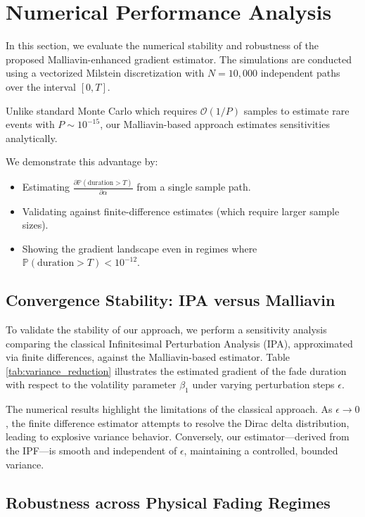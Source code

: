 \documentclass[11pt]{article}
\newcommand{\Pb}{\mathbb P}
\begin{document}
\section{Numerical Performance Analysis}\label{sec:Num_Perf}

In this section, we evaluate the numerical stability and robustness of the proposed Malliavin-enhanced gradient estimator. The simulations are conducted using a vectorized Milstein discretization with $N=10,000$ independent paths over the interval $[0, T]$.

Unlike standard Monte Carlo which requires $\mathcal{O}(1/P)$ samples to estimate rare events with $P \sim 10^{-15}$, our Malliavin-based approach estimates sensitivities analytically.

We demonstrate this advantage by:
\begin{itemize}
    \item[(a)] Estimating $\frac{\partial \Pb(\text{duration}>T)}{\partial \alpha}$ from a single sample path.
    \item[(b)] Validating against finite-difference estimates (which require larger sample sizes).
    \item[(c)] Showing the gradient landscape even in regimes where $\Pb(\text{duration}>T) < 10^{-12}$.
\end{itemize}

\subsection{Convergence Stability: IPA versus Malliavin}

To validate the stability of our approach, we perform a sensitivity analysis comparing the classical Infinitesimal Perturbation Analysis (IPA), approximated via finite differences, against the Malliavin-based estimator. Table \ref{tab:variance_reduction} illustrates the estimated gradient of the fade duration with respect to the volatility parameter $\beta_1$ under varying perturbation steps $\epsilon$.

The numerical results highlight the limitations of the classical approach. As $\epsilon \to 0$, the finite difference estimator attempts to resolve the Dirac delta distribution, leading to explosive variance behavior. Conversely, our estimator—derived from the IPF—is smooth and independent of $\epsilon$, maintaining a controlled, bounded variance.

\subsection{Robustness across Physical Fading Regimes}
\end{document}
